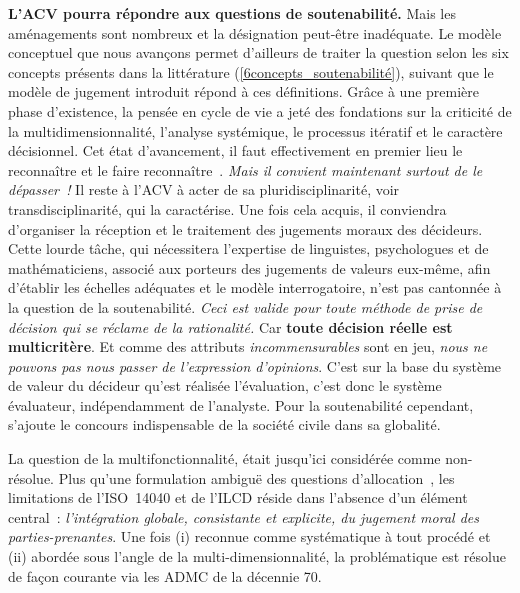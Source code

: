 \textbf{L'ACV pourra répondre aux questions de soutenabilité.}
Mais les aménagements sont nombreux et la désignation peut-être inadéquate.
Le modèle conceptuel que nous avançons permet d'ailleurs de traiter la question selon les six concepts présents dans la littérature (\ref{6concepts_soutenabilité}), suivant que le modèle de jugement introduit répond à ces définitions.
Grâce à une première phase d'existence, la pensée en cycle de vie a jeté des fondations sur la criticité de la multidimensionnalité, l'analyse systémique, le processus itératif et le caractère décisionnel.
Cet état d'avancement, il faut effectivement en premier lieu le reconnaître et le faire reconnaître~\cite[conclusion p.244]{klopffer_background_2014}.
\textit{Mais il convient maintenant surtout de le dépasser~!}
Il reste à l'ACV à acter de sa pluridisciplinarité, voir transdisciplinarité, qui la caractérise.
Une fois cela acquis, il conviendra d'organiser la réception et le traitement des jugements moraux des décideurs.
Cette lourde tâche, qui nécessitera l'expertise de linguistes, psychologues et de mathématiciens, associé aux porteurs des jugements de valeurs eux-même, afin d'établir les échelles adéquates et le modèle interrogatoire, n'est pas cantonnée à la question de la soutenabilité.
\emph{Ceci est valide pour toute méthode de prise de décision qui se réclame de la rationalité.}
Car \textbf{toute décision réelle est multicritère}.
Et comme des attributs \emph{incommensurables} sont en jeu, \emph{nous ne pouvons pas nous passer de l'expression d'opinions}.
C'est sur la base du système de valeur du décideur qu'est réalisée l'évaluation, c'est donc le système évaluateur, indépendamment de l'analyste.
Pour la soutenabilité cependant, s'ajoute le concours indispensable de la société civile dans sa globalité.

La question de la multifonctionnalité, était jusqu'ici considérée comme non-résolue.
Plus qu'une formulation ambiguë des questions d'allocation~\cite{weidema_has_2014},
les limitations de l'ISO~14040 et de l'ILCD réside dans l'absence d'un élément central~: \emph{l'intégration globale, consistante et explicite, du jugement moral des parties-prenantes}.
Une fois (i) reconnue comme systématique à tout procédé et (ii) abordée sous l'angle de la multi-dimensionnalité, la problématique est résolue de façon courante via les \gls{ADMC} de la décennie 70.

